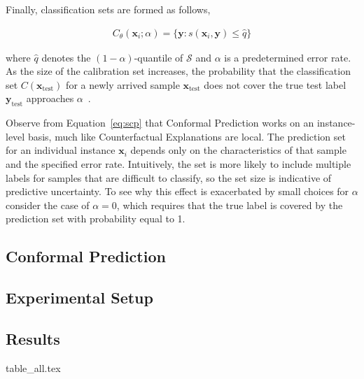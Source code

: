 \documentclass{article}
\begin{document}
Finally, classification sets are formed as follows,

\begin{equation}\label{eq:scp}
  \begin{aligned}
    C_{\theta}(\mathbf{x}_i;\alpha)=\{\mathbf{y}: s(\mathbf{x}_i,\mathbf{y}) \le \hat{q}\}
  \end{aligned}
\end{equation}

where $\hat{q}$ denotes the $(1-\alpha)$-quantile of $\mathcal{S}$ and $\alpha$ is a predetermined error rate. As the size of the calibration set increases, the probability that the classification set $C(\mathbf{x}_{\text{test}})$ for a newly arrived sample $\mathbf{x}_{\text{test}}$ does not cover the true test label $\mathbf{y}_{\text{test}}$ approaches $\alpha$~\citep{angelopoulos2021gentle}. 

Observe from Equation~\ref{eq:scp} that Conformal Prediction works on an instance-level basis, much like Counterfactual Explanations are local. The prediction set for an individual instance $\mathbf{x}_i$ depends only on the characteristics of that sample and the specified error rate. Intuitively, the set is more likely to include multiple labels for samples that are difficult to classify, so the set size is indicative of predictive uncertainty. To see why this effect is exacerbated by small choices for $\alpha$ consider the case of $\alpha=0$, which requires that the true label is covered by the prediction set with probability equal to 1.

\subsection{Conformal Prediction}\label{app:eccco}

\subsection{Experimental Setup}\label{app:setup}
\subsection{Results}\label{app:results}

{table_all.tex}
\end{document}

